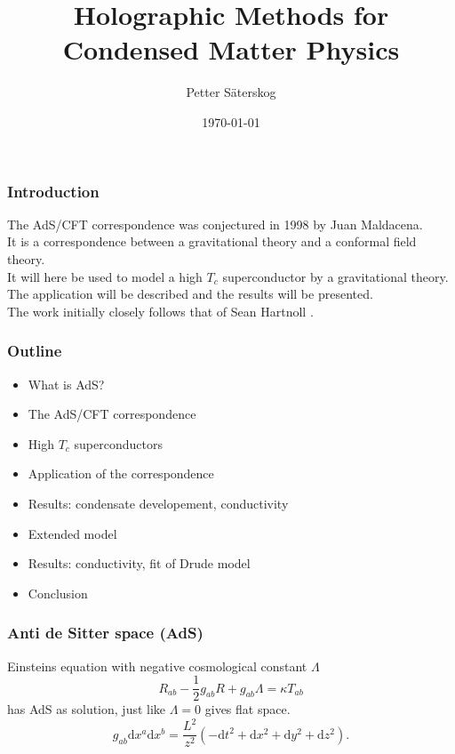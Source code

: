 \documentclass{beamer}
\renewcommand{\d}{\ensuremath{\mathrm{d}}}
\begin{document}
\title{Holographic Methods for Condensed Matter Physics}   
\author{Petter Säterskog} 
\date{\today} 

\frame{\titlepage} 

\begin{frame}
\frametitle{Introduction}
The AdS/CFT correspondence was conjectured in 1998 by Juan Maldacena.\\

It is a correspondence between a gravitational theory and a conformal field theory.\\

It will here be used to model a high $T_c$ superconductor by a gravitational theory.\\

The application will be described and the results will be presented.\\

The work initially closely follows that of Sean Hartnoll \cite{hartnoll8}.
\end{frame}

\begin{frame}
\frametitle{Outline}
\begin{itemize}
  \item What is AdS?
  \item The AdS/CFT correspondence
  \item High $T_c$ superconductors
  \item Application of the correspondence
  \item Results: condensate developement, conductivity
  \item Extended model
  \item Results: conductivity, fit of Drude model
  \item Conclusion
  \end{itemize}
\end{frame}

\begin{frame}
\frametitle{Anti de Sitter space (AdS)}
Einsteins equation with negative cosmological constant $\Lambda$
\begin{equation}
R_{ab}-\frac{1}{2}g_{ab}R+g_{ab}\Lambda=\kappa T_{ab}\label{einstein}
\end{equation}
has AdS as solution, just like $\Lambda=0$ gives flat space.
\begin{equation}
 g_{ab}\d x^a\d x^b=\frac{L^2}{z^2}\left(-\d t^2+\d x^2+\d y^2+\d z^2\right).\label{metric}
\end{equation}
\end{frame}
\end{document}

